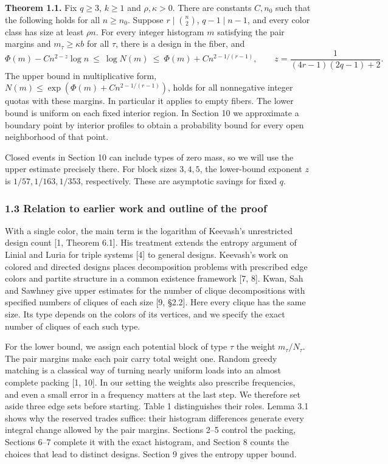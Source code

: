 \documentclass[english,11pt,a4paper]{article}
\begin{document}
\textbf{Theorem 1.1.} Fix \(q\ge3\), \(k\ge1\) and \(\rho,\kappa>0\). There are constants \(C,n_0\) such that the following holds for all \(n\ge n_0\). Suppose \(r\mid\binom n2\), \(q-1\mid n-1\), and every color class has size at least \(\rho n\). For every integer histogram \(m\) satisfying the pair margins and \(m_\tau\ge\kappa b\) for all \(\tau\), there is a design in the fiber, and \[\Phi(m)-C n^{2-z}\log n\ \le\ \log N(m)\
 \le\ \Phi(m)+C n^{2-1/(r-1)},\qquad
 z=\frac{1}{(4r-1)(2q-1)+2}. \tag{2}\] The upper bound in multiplicative form, \(N(m)\le\exp(\Phi(m)+C n^{2-1/(r-1)})\), holds for all nonnegative integer quotas with these margins. In particular it applies to empty fibers. The lower bound is uniform on each fixed interior region. In Section 10 we approximate a boundary point by interior profiles to obtain a probability bound for every open neighborhood of that point.

Closed events in Section 10 can include types of zero mass, so we will use the upper estimate precisely there. For block sizes \(3,4,5\), the lower-bound exponent \(z\) is \(1/57,1/163,1/353\), respectively. These are asymptotic savings for fixed \(q\).

\subsubsection{1.3 Relation to earlier work and outline of the proof}\label{relation-to-earlier-work-and-outline-of-the-proof}

With a single color, the main term is the logarithm of Keevash's unrestricted design count {[}1, Theorem 6.1{]}. His treatment extends the entropy argument of Linial and Luria for triple systems {[}4{]} to general designs. Keevash's work on colored and directed designs places decomposition problems with prescribed edge colors and partite structure in a common existence framework {[}7, 8{]}. Kwan, Sah and Sawhney give upper estimates for the number of clique decompositions with specified numbers of cliques of each size {[}9, §2.2{]}. Here every clique has the same size. Its type depends on the colors of its vertices, and we specify the exact number of cliques of each such type.

For the lower bound, we assign each potential block of type \(\tau\) the weight \(m_\tau/N_\tau\). The pair margins make each pair carry total weight one. Random greedy matching is a classical way of turning nearly uniform loads into an almost complete packing {[}1, 10{]}. In our setting the weights also prescribe frequencies, and even a small error in a frequency matters at the last step. We therefore set aside three edge sets before starting. Table 1 distinguishes their roles. Lemma 3.1 shows why the reserved trades suffice: their histogram differences generate every integral change allowed by the pair margins. Sections 2--5 control the packing, Sections 6--7 complete it with the exact histogram, and Section 8 counts the choices that lead to distinct designs. Section 9 gives the entropy upper bound.
\end{document}
